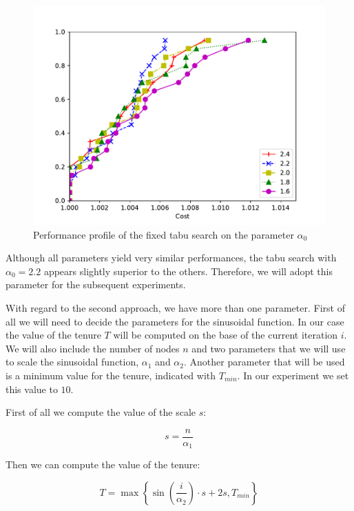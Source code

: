 \documentclass{article}
\begin{document}
\begin{figure}[ht]
        \caption{Performance profile of the fixed tabu search on the parameter $\alpha_0$}
        \label{fig:ht_fixten}
        \centering
        \includegraphics[width=340pt]{assets/ht_fixten.pdf}
\end{figure}

Although all parameters yield very similar performances, the tabu search with $\alpha_0 = 2.2$
appears slightly superior to the others. Therefore, we will adopt this parameter for the subsequent experiments.

\clearpage

With regard to the second approach, we have more than one parameter. First of
all we will need to decide the parameters for the sinusoidal function. In our
case the value of the tenure $T$ will be computed on the base of the current
iteration $i$. We will also include the number of nodes $n$ and two parameters
that we will use to scale the sinusoidal function, $\alpha_1$ and $\alpha_2$.
Another parameter that will be used is a minimum value for the tenure,
indicated with $T_{min}$. In our experiment we set this value to $10$.

First of all we compute the value of the scale $s$:

\begin{equation*}
        s = \frac{n}{\alpha_1}
\end{equation*}

Then we can compute the value of the tenure:

\begin{equation*}
        T = \max \left\{
                \sin \left( \frac{i}{\alpha_2} \right) \cdot s + 2 s ,
                T_{min}
        \right\}
\end{equation*}
\end{document}
